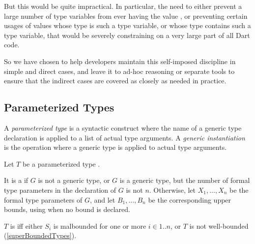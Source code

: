 \documentclass[makeidx]{article}
\begin{document}
{{  But this would be quite impractical.
  In particular, the need to either prevent a large number of type variables
  from ever having the value \VOID,
  or preventing certain usages of values whose type is such a type variable,
  or whose type contains such a type variable,
  that would be severely constraining on a very large part of all Dart code.

  So we have chosen to help developers maintain this self-imposed discipline
  in simple and direct cases,
  and leave it to ad-hoc reasoning or separate tools to ensure
  that the indirect cases are covered as closely as needed in practice.%
}


\subsection{Parameterized Types}


\LMHash{}%
A \emph{parameterized type} is a syntactic construct
where the name of a generic type declaration is applied to
a list of actual type arguments.
A \emph{generic instantiation} is the operation where
a generic type is applied to actual type arguments.


\LMHash{}%
Let $T$ be a parameterized type .

\LMHash{}%
It is a  if $G$ is not a generic type,
or $G$ is a generic type,
but the number of formal type parameters in the declaration of $G$ is not $n$.
Otherwise, let
$X_1, \ldots, X_n$
be the formal type parameters of $G$, and let
$B_1, \ldots, B_n$
be the corresponding upper bounds, using \DYNAMIC{} when no bound is declared.

\LMHash{}%
$T$ is  if{}f either
$S_i$ is malbounded for one or more $i \in 1 .. n$,
or $T$ is not well-bounded (\ref{superBoundedTypes}).

}
\end{document}
